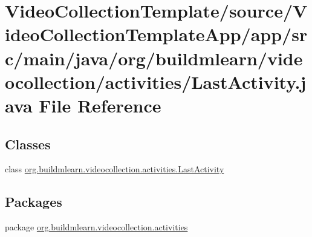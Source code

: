 \hypertarget{VideoCollectionTemplate_2source_2VideoCollectionTemplateApp_2app_2src_2main_2java_2org_2buildmlef991580307da474b0ed4b1a6bf57dbb8}{}\section{Video\+Collection\+Template/source/\+Video\+Collection\+Template\+App/app/src/main/java/org/buildmlearn/videocollection/activities/\+Last\+Activity.java File Reference}
\label{VideoCollectionTemplate_2source_2VideoCollectionTemplateApp_2app_2src_2main_2java_2org_2buildmlef991580307da474b0ed4b1a6bf57dbb8}
\subsection*{Classes}
\begin{DoxyCompactItemize}
\item 
class \hyperlink{classorg_1_1buildmlearn_1_1videocollection_1_1activities_1_1LastActivity}{org.\+buildmlearn.\+videocollection.\+activities.\+Last\+Activity}
\end{DoxyCompactItemize}
\subsection*{Packages}
\begin{DoxyCompactItemize}
\item 
package \hyperlink{namespaceorg_1_1buildmlearn_1_1videocollection_1_1activities}{org.\+buildmlearn.\+videocollection.\+activities}
\end{DoxyCompactItemize}
